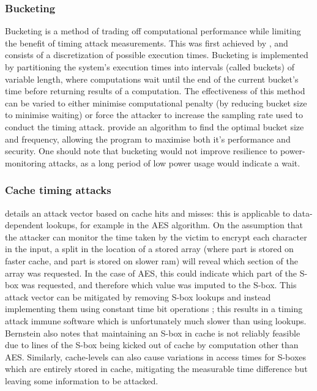 \documentclass[british,11pt,a4paper]{article}
\begin{document}
\subsubsection{Bucketing}
Bucketing is a method of trading off computational performance while limiting the benefit of timing attack measurements.
This was first achieved by \citet{Kopf2009-mh}, and consists of a discretization of possible execution times.
Bucketing is implemented by partitioning the system's execution times into intervals (called buckets) of variable length,
where computations wait until the end of the current bucket's time before returning results of a computation. The effectiveness of this method
can be varied to either minimise computational penalty (by reducing bucket size to minimise waiting) or force the attacker to increase the sampling rate used to conduct the timing attack.
\citeauthor{Kopf2009-mh} provide an algorithm to find the optimal bucket size and frequency, allowing the program to maximise both it's performance and security.
One should note that bucketing would not improve resilience to power-monitoring attacks, as a long period of low power usage would indicate a wait.

\subsubsection{Cache timing attacks}
\citet{Bernstein05cache-timingattacks} details an attack vector based on cache hits and misses:
this is applicable to data-dependent lookups, for example in the AES algorithm.
On the assumption that the attacker can monitor the time taken by the victim to encrypt each character in the input,
a split in the location of a stored array (where part is stored on faster cache, and part is stored on slower ram) will reveal
which section of the array was requested. In the case of AES, this could indicate which part of the S-box was requested, and therefore
which value was imputed to the S-box. This attack vector can be mitigated by removing S-box lookups and instead implementing them using
constant time bit operations \cite{Bernstein05cache-timingattacks}; this results in a timing attack immune software which is unfortunately much slower than using lookups.
Bernstein also notes that maintaining an S-box in cache is not reliably feasible due to lines of the S-box being kicked out of cache by
computation other than AES. Similarly, cache-levels can also cause variations in access times for S-boxes which are entirely stored in cache,
mitigating the measurable time difference but leaving some information to be attacked.
\end{document}
